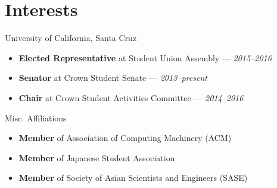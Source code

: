 \documentclass[11pt]{article}
\begin{document}
\section*{Interests}
\begin{description}
   \itemsep0pt \parskip0pt
   \item[Student Government] University of California, Santa Cruz
      \begin{itemize}
         \itemsep0pt \parskip0pt
         \item \textbf{Elected Representative} at Student Union Assembly ---
            \textit{2015--2016}
         \item \textbf{Senator} at Crown Student Senate --- \textit{2013--present}
         \item \textbf{Chair} at Crown Student Activities Committee ---
            \textit{2014--2016}
      \end{itemize}
   \item[Organizations] Misc. Affiliations
      \begin{itemize}
         \item \textbf{Member} of Association of Computing Machinery (ACM)
         \item \textbf{Member} of Japanese Student Association
         \item \textbf{Member} of Society of Asian Scientists and Engineers (SASE)
      \end{itemize}
\end{description}
\end{document}
